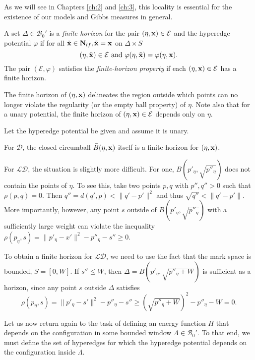 As we will see in Chapters \ref{ch:2} and \ref{ch:3}, this locality is essential for the existence of our models and Gibbs measures in general. 

\begin{definition}
	A set $\Delta \in \mathcal B_0'$ is a \textit{finite horizon} for the pair $(\eta,{\mathbf{x}}) \in \mathcal E$ and the hyperedge potential $\varphi$ if for all $\tilde{{\mathbf{x}}} \in \mathbf N_{lf}, \tilde{{\mathbf{x}}} = {\mathbf{x}}$ on $\Delta\times S$ 
$$(\eta,\tilde{{\mathbf{x}}})\in\mathcal E \text{ and } \varphi(\eta,\tilde{{\mathbf{x}}}) = \varphi(\eta,{\mathbf{x}}). $$
The pair $(\mathcal E, \varphi)$ satisfies the \textit{finite-horizon property} if each $(\eta,{\mathbf{x}})\in \mathcal E$ has a finite horizon.
\end{definition}

The finite horizon of $(\eta,{\mathbf{x}})$ delineates the region outside which points can no longer violate the regularity (or the empty ball property) of $\eta$. 
Note also that for a unary potential, the finite horizon of $(\eta,{\mathbf{x}})\in \mathcal E$ depends only on $\eta$.

\begin{remark} \label{r:horizons}
Let the hyperedge potential be given and assume it is unary.

For $\mathcal D$, the closed circumball $\bar B(\eta,{\mathbf{x}})$ itself is a finite horizon for $(\eta,{\mathbf{x}})$.

For $\mathcal {LD}$, the situation is slightly more difficult. For one, $B(p'_\eta, \sqrt{p''_\eta})$ does not contain the points of $\eta$. To see this, take two points $p,q$ with $p'',q''>0$ such that $\rho(p,q)=0$. Then $q'' = d(q',p) < \|q'-p'\|^2$ and thus $\sqrt{q''} < \|q'-p'\|$. More importantly, however, any point $s$ outside of $B(p'_\eta, \sqrt{p''_\eta})$ with a sufficiently large weight can violate the inequality $\rho(p_\eta,s) = \|p'_\eta - x'\|^2 - p''_\eta - s'' \geq 0$. 

To obtain a finite horizon for $\mathcal {LD}$, we need to use the fact that the mark space is bounded, $S=[0,W]$. If $s'' \leq W$, then $\Delta = B(p'_\eta, \sqrt{p''_\eta + W})$ is sufficient as a horizon, since any point $s$ outside $\Delta$ satisfies
$$\rho(p_\eta, s) = \|p'_\eta - s'\|^2 - p''_\eta - s'' \geq \left(\sqrt{p''_\eta+W}\right)^2-p''_\eta-W = 0.$$ 

\end{remark}

Let us now return again to the task of defining an energy function $H$ that depends on the configuration in some bounded window $\Lambda \in \mathcal B_0'$. To that end, we must define the set of hyperedges for which the hyperedge potential depends on the configuration inside $\Lambda$. 


